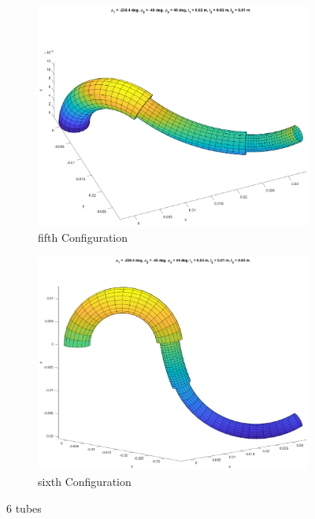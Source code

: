 \documentclass[12pt, twoside]{report}
\begin{document}
\begin{figure}[H]
\begin{subfigure}[b]{0.3\textwidth}
         \includegraphics[width=\textwidth]{TP_1/sample4.eps}
         \caption{fifth Configuration}
         \label{fig:Tube5}
     \end{subfigure}
    \hfill
     \begin{subfigure}[b]{0.3\textwidth}
         \centering
         \includegraphics[width=\textwidth]{TP_1/sample5.eps}
         \caption{sixth Configuration}
         \label{fig:Tube6}
     \end{subfigure}
        \caption{6 tubes}
        \label{fig:tubes}
\end{figure}
\end{document}
